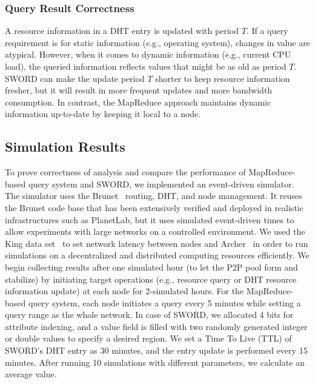 \documentclass{acm_proc_article-sp}
\begin{document}
\subsubsection{Query Result Correctness}
A resource information in a DHT entry is updated with period $T$. If a query requirement is for static information (e.g., operating system), changes in value are atypical.
However, when it comes to dynamic information (e.g., current CPU load), the queried information reflects values that might be as old as period $T$. 
SWORD can make the update period $T$ shorter to keep resource information fresher, but it will result in more frequent updates and more bandwidth consumption.
In contrast, the MapReduce approach maintains dynamic information up-to-date by keeping it local to a node.
\subsection{Simulation Results}
To prove correctness of analysis and compare the performance of MapReduce-based query system and SWORD, we implemented an event-driven simulator. The simulator uses the Brunet~\cite{brunet} routing, DHT, and node management. It reuses the Brunet code base that has been extensively verified and deployed in realistic infrastructures such as PlanetLab, but it uses simulated event-driven times to allow experiments with large networks on a controlled environment.
We used the King data set~\cite{king} to set network latency between nodes and Archer~\cite{archer} in order to run simulations on a decentralized and distributed computing resources efficiently. 
We begin collecting results after one simulated hour (to let the P2P pool form and stabilize) by initiating target operations (e.g., resource query or DHT resource information update) at each node for 2-simulated hours.
For the MapReduce-based query system, each node initiates a query every 5 minutes while setting a query range as the whole network. 
In case of SWORD, we allocated 4 bits for attribute indexing, and a value field is filled with two randomly generated integer or double values to specify a desired region. 
We set a Time To Live (TTL) of SWORD's DHT entry as 30 minutes, and the entry update is performed every 15 minutes.
After running 10 simulations with different parameters, we calculate an average value.
\end{document}
